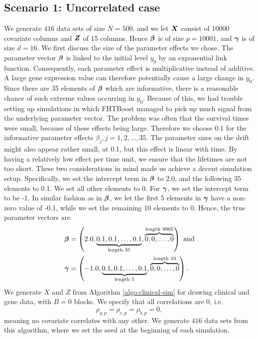 \subsection{Scenario 1: Uncorrelated case}
We generate $416$ data sets of size $N=500$, and we let $\bm{X}$ consist of 10000 covariate columns and $\bm{Z}$ of 15 columns.
Hence $\boldsymbol{\beta}$ is of size $p=10001$, and $\boldsymbol{\gamma}$ is of size $d=16$.
We first discuss the size of the parameter effects we chose.
The parameter vector $\boldsymbol{\beta}$ is linked to the initial level $y_0$ by an exponential link function.
Consequently, each parameter effect is multiplicative instead of additive.
A large gene expression value can therefore potentially cause a large change in $y_0$.
Since there are 35 elements of $\boldsymbol{\beta}$ which are informative, there is a reasonable chance of such extreme values occurring in $y_0$.
Because of this, we had trouble setting up simulations in which FHTBoost managed to pick up much signal from the underlying parameter vector.
The problem was often that the survival times were small, because of these effects being large.
Therefore we choose 0.1 for the informative parameter effects $\beta_j,j=1,2,\ldots,35$.
The parameter sizes on the drift might also appear rather small, at 0.1, but this effect is linear with time.
By having a relatively low effect per time unit, we ensure that the lifetimes are not too short.
These two considerations in mind made us achieve a decent simulation setup.
Specifically, we set the intercept term in $\boldsymbol{\beta}$ to 2.0, and the following $35$ elements to 0.1.
We set all other elements to 0.
For $\boldsymbol{\gamma}$, we set the intercept term to be -1.
In similar fashion as in $\boldsymbol{\beta}$, we let the first 5 elements in $\boldsymbol{\gamma}$ have a non-zero value of -0.1, while we set the remaining 10 elements to 0.
Hence, the true parameter vectors are
\begin{align*}
    \boldsymbol{\beta}&=\left(2.0, \underbrace{0.1, 0.1, \ldots, 0.1}_{\text{length 35}}, \overbrace{0, 0, \ldots, 0}^{\text{length 9965}}\right)\text{ and}\\
    \boldsymbol{\gamma}&=\left(-1.0, \underbrace{0.1, 0.1, \ldots, 0.1}_{\text{length 5}}, \overbrace{0, 0, \ldots, 0}^{\text{length 10}}\right).
\end{align*}
We generate $X$ and $Z$ from Algorithm \ref{algo:clinical-sim} for drawing clinical and gene data, with $B=0$ blocks.
We specify that all correlations are 0, i.e.
\begin{equation*}
    \rho_{g,p}=\rho_{c,p}=\rho_{b,p}=0,
\end{equation*}
meaning no covariate correlates with any other.
We generate $416$ data sets from this algorithm, where we set the seed at the beginning of each simulation.


